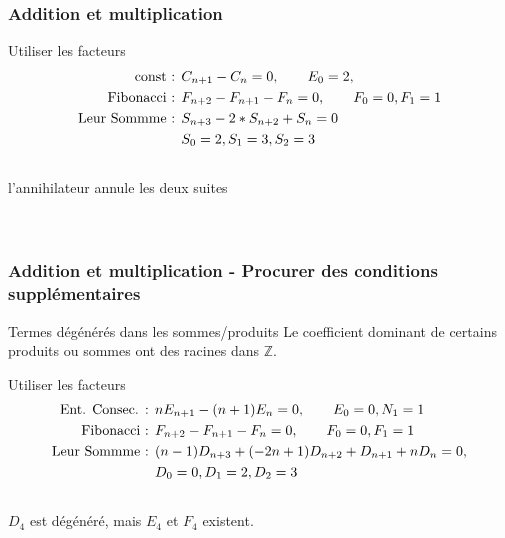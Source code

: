 \documentclass{beamer}
\begin{document}


\begin{frame}
\frametitle{Addition et multiplication}
\begin{center}
\begin{exampleblock}{Utiliser les facteurs}
    \begin{align*}
        \textnormal{const : } &C_{n+1} - C_n = 0,\qquad E_0 = 2,\\
        \textnormal{Fibonacci : } &F_{n+2} - F_{n+1} - F_n = 0,\qquad F_0=0, F_1=1\\
        \textnormal{Leur Sommme : } &S_{n+3} - 2*S_{n+2} + S_n = 0 \\
        &S_0 = 2, S_1 = 3, S_2 = 3\\
    \end{align*}\\
    l'annihilateur annule les deux suites\\
    [0, 1, 1, 2, 3, 5, 8, 13, 21, 34,...]\\
    [2, 2, 2, 2, 2, 2, 2, 2, 2, 2,..]\\
\end{exampleblock}
\end{center}
\end{frame}

\begin{frame}
\frametitle{Addition et multiplication - Procurer des conditions supplémentaires}
\begin{center}
\begin{alertblock}{Termes dégénérés dans les sommes/produits}
    Le coefficient dominant de certains produits ou sommes ont des racines dans $\mathbb Z$.
\end{alertblock}
\begin{exampleblock}{Utiliser les facteurs}
    \begin{align*}
        \textnormal{Ent. Consec. : } &nE_{n+1} - (n+1)E_n = 0,\qquad E_0 = 0, N_1 = 1\\
        \textnormal{Fibonacci : } &F_{n+2} - F_{n+1} - F_n = 0,\qquad F_0=0, F_1=1\\
        \textnormal{Leur Sommme : } &(n - 1)D_{n+3} + (-2n + 1)D_{n+2} + D_{n+1} + nD_n = 0, \\
        &D_0 = 0, D_1 = 2, D_2 = 3\\
    \end{align*}\\
    \vspace{-0.7cm}
    $D_4$ est dégénéré, mais $E_4$ et $F_4$ existent.
\end{exampleblock}
\end{center}
\end{frame}
\end{document}
